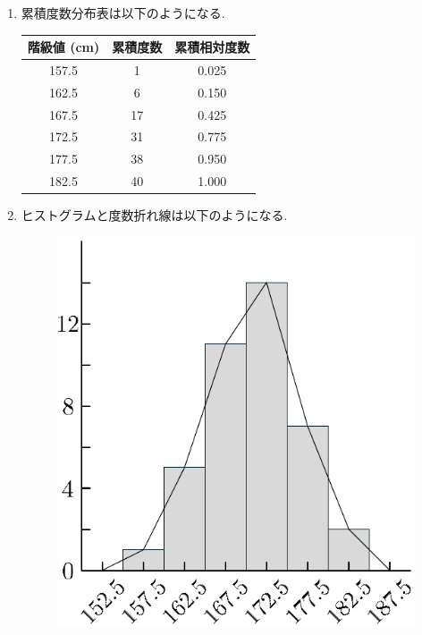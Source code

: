 \vspace{\baselineskip}
\check
\begin{qenumerate}
	\item{
		\begin{enumerate}
			\item{
				累積度数分布表は以下のようになる.
				\begin{table}[H]
					\centering
					\begin{tabular}{c|c|c} \hline
						階級値 (cm) & 累積度数 & 累積相対度数 \\ \hline
						157.5 &  1 & 0.025 \\
						162.5 &  6 & 0.150 \\
						167.5 & 17 & 0.425 \\
						172.5 & 31 & 0.775 \\
						177.5 & 38 & 0.950 \\
						182.5 & 40 & 1.000 \\ \hline
					\end{tabular}
				\end{table}
			}
			\item{
				ヒストグラムと度数折れ線は以下のようになる.
				\begin{figure}[H]
					\centering
					\includegraphics[scale = 0.5]{./figure/81.pdf}

\end{figure}}
\end{enumerate}}
\end{qenumerate}
